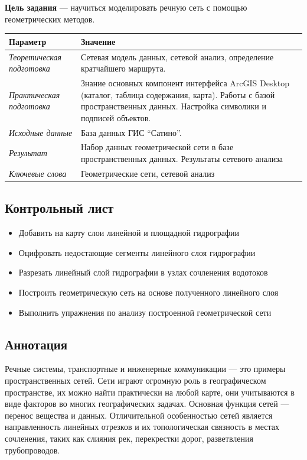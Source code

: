\documentclass[]{book}
\providecommand{\tightlist}{%
  \setlength{\itemsep}{0pt}\setlength{\parskip}{0pt}}
\theoremstyle{definition}
\theoremstyle{definition}
\theoremstyle{definition}
\theoremstyle{remark}
\begin{document}
\textbf{Цель задания} --- научиться моделировать речную сеть с помощью
геометрических методов.

\begin{longtable}[]{@{}ll@{}}
\toprule
Параметр & Значение\tabularnewline
\midrule
\endhead
\emph{Теоретическая подготовка} & Сетевая модель данных, сетевой анализ,
определение кратчайшего маршрута.\tabularnewline
\emph{Практическая подготовка} & Знание основных компонент интерфейса
ArcGIS Desktop (каталог, таблица содержания, карта). Работы с базой
пространственных данных. Настройка символики и подписей
объектов.\tabularnewline
\emph{Исходные данные} & База данных ГИС ``Сатино''.\tabularnewline
\emph{Результат} & Набор данных геометрической сети в базе
пространственных данных. Результаты сетевого анализа\tabularnewline
\emph{Ключевые слова} & Геометрические сети, сетевой
анализ\tabularnewline
\bottomrule
\end{longtable}

\hypertarget{network-hydro-control}{%
\subsection{Контрольный лист}\label{network-hydro-control}}

\begin{itemize}
\tightlist
\item
  Добавить на карту слои линейной и площадной гидрографии
\item
  Оцифровать недостающие сегменты линейного слоя гидрографии
\item
  Разрезать линейный слой гидрографии в узлах сочленения водотоков
\item
  Построить геометрическую сеть на основе полученного линейного слоя
\item
  Выполнить упражнения по анализу построенной геометрической сети
\end{itemize}

\hypertarget{network-hydro-annotation}{%
\subsection{Аннотация}\label{network-hydro-annotation}}

Речные системы, транспортные и инженерные коммуникации --- это примеры
пространственных сетей. Сети играют огромную роль в географическом
пространстве, их можно найти практически на любой карте, они учитываются
в виде факторов во многих географических задачах. Основная функция сетей
--- перенос вещества и данных. Отличительной особенностью сетей является
направленность линейных отрезков и их топологическая связность в местах
сочленения, таких как слияния рек, перекрестки дорог, разветвления
трубопроводов.
\end{document}
